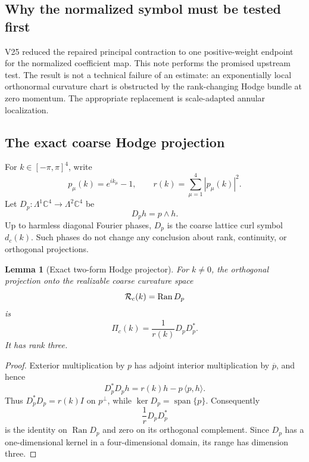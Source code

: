 \documentclass[11pt,oneside]{book}
\newtheorem{lemma}[theorem]{Lemma}
\theoremstyle{definition}
\theoremstyle{remark}
\begin{document}
\subsection{Why the normalized symbol must be tested first}

V25 reduced the repaired principal contraction to one positive-weight
endpoint for the normalized coefficient map.  This note performs the
promised upstream test.  The result is not a technical failure of an
estimate: an exponentially local orthonormal curvature chart is
obstructed by the rank-changing Hodge bundle at zero momentum.  The
appropriate replacement is scale-adapted annular localization.

\subsection{The exact coarse Hodge projection}

For \(k\in[-\pi,\pi]^4\), write
\[
 p_\mu(k)=e^{ik_\mu}-1,\qquad
 r(k)=\sum_{\mu=1}^4|p_\mu(k)|^2.                                \tag{26.1}
\]
Let \(D_p:\Lambda^1{\mathbb C}^4\to\Lambda^2{\mathbb C}^4\) be
\[
                              D_p h=p\wedge h.                    \tag{26.2}
\]
Up to harmless diagonal Fourier phases, \(D_p\) is the coarse lattice
curl symbol \(d_c(k)\).  Such phases do not change any conclusion
about rank, continuity, or orthogonal projections.

\begin{lemma}[Exact two-form Hodge projector]
\label{lem:e8v26-Hodge-projector}
For \(k\ne0\), the orthogonal projection onto the realizable coarse
curvature space
\[
                 {\cal R}_c(k)=\operatorname{Ran}D_p
\]
is
\[
\boxed{\qquad
 \Pi_c(k)=\frac1{r(k)}D_pD_p^* .
\qquad}                                                           \tag{26.3}
\]
It has rank three.
\end{lemma}

\begin{proof}
Exterior multiplication by \(p\) has adjoint interior multiplication
by \(\overline p\), and hence
\[
 D_p^*D_ph=r(k)h-p\,\langle p,h\rangle .                          \tag{26.3a}
\]
Thus \(D_p^*D_p=r(k)I\) on \(p^\perp\), while
\(\ker D_p=\operatorname{span}\{p\}\).  Consequently
\[
 \frac1rD_pD_p^*
\]
is the identity on \(\operatorname{Ran}D_p\) and zero on its
orthogonal complement.  Since \(D_p\) has a one-dimensional kernel
in a four-dimensional domain, its range has dimension three.
\end{proof}
\end{document}
